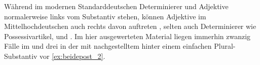 

Während im modernen Standarddeutschen Determinierer und Adjektive normalerweise
links vom Substantiv stehen, können Adjektive im Mittelhochdeutschen
auch rechts davon auftreten \autocite[185--186, 237--243]{ksw2}, selten auch
Determinierer wie Possessivartikel,   und 
\autocite[515--517, 551--552, 623--624]{ksw2}. Im hier ausgewerteten Material
liegen immerhin zwanzig Fälle im  und drei in der 
mit nachgestelltem  hinter einem einfachen Plural-Substantiv vor
\cref{ex:beidepost_2}.

